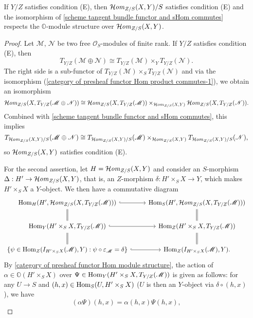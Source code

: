 \begin{corollary}\label{scheme tangent bundle functor and sHom module structure}
If $Y/Z$ satisfies condition (E), then $\operatorname{\mathcal{H}\hspace*{-0.4pt}\textit{om}\hspace{0.5pt}}_{Z/S}(X,Y)/S$ satisfies condition (E) and the isomorphism of \cref{scheme tangent bundle functor and sHom commutes} respects the $\mathbb{O}$-module structure over $\operatorname{\mathcal{H}\hspace*{-0.4pt}\textit{om}\hspace{0.5pt}}_{Z/S}(X,Y)$.
\end{corollary}
\begin{proof}
Let $\mathscr{M}$, $\mathscr{N}$ be two free $\mathscr{O}_S$-modules of finite rank. If $Y/Z$ satisfies condition (E), then
\[T_{Y/Z}(\mathscr{M}\oplus\mathscr{N})\cong T_{Y/Z}(\mathscr{M})\times_Y T_{Y/Z}(\mathscr{N}).\]
The right side is a sub-functor of $T_{Y/Z}(\mathscr{M})\times_ST_{Y/Z}(\mathscr{N})$ and via the isomorphism (\ref{category of presheaf functor Hom product commutes-1}), we obtain an isomorphism
\begin{align*}
\operatorname{\mathcal{H}\hspace*{-0.4pt}\textit{om}\hspace{0.5pt}}_{Z/S}(X,T_{Y/Z}(\mathscr{M}\oplus\mathscr{N}))\cong\operatorname{\mathcal{H}\hspace*{-0.4pt}\textit{om}\hspace{0.5pt}}_{Z/S}(X,T_{Y/Z}(\mathscr{M}))\times_{\operatorname{\mathcal{H}\hspace*{-0.4pt}\textit{om}\hspace{0.5pt}}_{Z/S}(X,Y)}\operatorname{\mathcal{H}\hspace*{-0.4pt}\textit{om}\hspace{0.5pt}}_{Z/S}(X,T_{Y/Z}(\mathscr{N})).
\end{align*}
Combined with \cref{scheme tangent bundle functor and sHom commutes}, this implies
\[T_{\operatorname{\mathcal{H}\hspace*{-0.4pt}\textit{om}\hspace{0.5pt}}_{Z/S}(X,Y)/S}(\mathscr{M}\oplus\mathscr{N})\cong T_{\operatorname{\mathcal{H}\hspace*{-0.4pt}\textit{om}\hspace{0.5pt}}_{Z/S}(X,Y)/S}(\mathscr{M})\times_{\operatorname{\mathcal{H}\hspace*{-0.4pt}\textit{om}\hspace{0.5pt}}_{Z/S}(X,Y)}T_{\operatorname{\mathcal{H}\hspace*{-0.4pt}\textit{om}\hspace{0.5pt}}_{Z/S}(X,Y)/S}(\mathscr{N}),\]
so $\operatorname{\mathcal{H}\hspace*{-0.4pt}\textit{om}\hspace{0.5pt}}_{Z/S}(X,Y)$ satisfies condition (E).\par
For the second assertion, let $H=\operatorname{\mathcal{H}\hspace*{-0.4pt}\textit{om}\hspace{0.5pt}}_{Z/S}(X,Y)$ and consider an $S$-morphism $\Delta:H'\to\operatorname{\mathcal{H}\hspace*{-0.4pt}\textit{om}\hspace{0.5pt}}_{Z/S}(X,Y)$, that is, an $Z$-morphism $\delta:H'\times_SX\to Y$, which makes $H'\times_SX$ a $Y$-object. We then have a commutative diagram
\[\begin{tikzcd}
\Hom_H(H',\sHom_{Z/S}(X,T_{Y/Z}(\mathscr{M})))\ar[r,hook]\ar[d,equal]&\Hom_S(H',\sHom_{Z/S}(X,T_{Y/Z}(\mathscr{M})))\ar[d,equal]\\
\Hom_Y(H'\times_SX,T_{Y/Z}(\mathscr{M}))\ar[r,hook]\ar[d,equal]&\Hom_Z(H'\times_SX,T_{Y/Z}(\mathscr{M}))\ar[d,equal]\\
\{\psi\in\Hom_Z(I_{H'\times_SX}(\mathscr{M}),Y):\psi\circ\eps_\mathscr{M}=\delta\}\ar[r,hook]&\Hom_Z(I_{H'\times_SX}(\mathscr{M}),Y).
\end{tikzcd}\]
By \cref{category of presheaf functor Hom module structure}, the action of $\alpha\in\mathbb{O}(H'\times_SX)$ over $\Psi\in\mathrm{Hom}_Y(H'\times_SX,T_{Y/Z}(\mathscr{M}))$ is given as follows: for any $U\to S$ and $(h,x)\in\mathrm{Hom}_S(U,H'\times_SX)$ ($U$ is then an $Y$-object via $\delta\circ(h,x)$), we have
\[(\alpha\Psi)(h,x)=\alpha(h,x)\Psi(h,x),\]

\end{proof}
